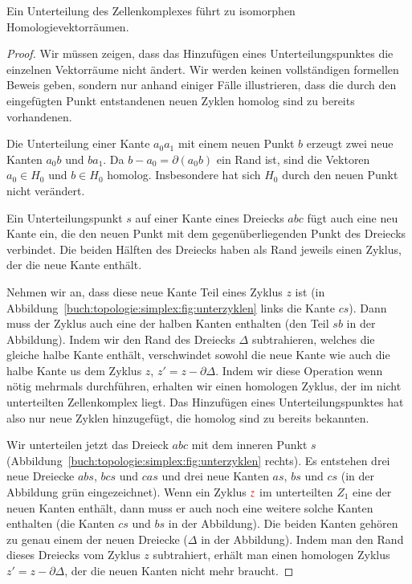 \begin{satz}
\label{buch:topologie:eulercharakteristik:satz:homologieunterteilung}
Ein Unterteilung des Zellenkomplexes führt zu isomorphen
Homologievektorräumen.
\end{satz}

\begin{proof}
%
Wir müssen zeigen, dass das Hinzufügen eines Unterteilungspunktes 
die einzelnen Vektorräume nicht ändert.
Wir werden keinen vollständigen formellen Beweis geben, sondern
nur anhand einiger Fälle illustrieren, dass die durch den eingefügten
Punkt entstandenen neuen Zyklen homolog sind zu bereits vorhandenen.

Die Unterteilung einer Kante $a_0a_1$ mit einem neuen Punkt $b$ erzeugt
zwei neue Kanten $a_0b$ und $ba_1$.
Da $b-a_0=\partial (a_0b)$ ein Rand ist, sind die Vektoren $a_0\in H_0$
und $b\in H_0$ homolog.
Insbesondere hat sich $H_0$ durch den neuen Punkt nicht verändert.

Ein Unterteilungspunkt $s$ auf einer Kante eines Dreiecks $abc$ fügt auch
eine neu Kante ein, die den neuen Punkt mit dem gegenüberliegenden
Punkt des Dreiecks verbindet.
Die beiden Hälften des Dreiecks haben als Rand jeweils einen Zyklus,
der die neue Kante enthält.

Nehmen wir an, dass diese neue Kante Teil eines Zyklus $z$ ist
(in Abbildung~\ref{buch:topologie:simplex:fig:unterzyklen} links
die Kante $cs$).
Dann muss der Zyklus auch eine der halben Kanten enthalten (den
Teil $sb$ in der Abbildung).
Indem wir den Rand des Dreiecks $\Delta$ subtrahieren, welches die gleiche
halbe Kante enthält, verschwindet sowohl die neue Kante wie auch die
halbe Kante us dem Zyklus $z$, $z'=z-\partial\Delta$.
Indem wir diese Operation wenn nötig mehrmals durchführen, erhalten
wir einen homologen Zyklus, der im nicht unterteilten Zellenkomplex
liegt.
Das Hinzufügen eines Unterteilungspunktes hat also nur neue Zyklen
hinzugefügt, die homolog sind zu bereits bekannten.

Wir unterteilen jetzt das Dreieck $abc$ mit dem inneren Punkt $s$
(Abbildung~\ref{buch:topologie:simplex:fig:unterzyklen} rechts).
Es entstehen drei neue Dreiecke $abs$, $bcs$ und $cas$ und drei neue
Kanten $as$, $bs$ und $cs$ (in der Abbildung {\color{darkgreen}grün}
eingezeichnet).
Wenn ein Zyklus ${\color{darkred}z}$ im unterteilten $Z_1$ eine der
neuen Kanten enthält, dann muss er auch noch eine weitere solche
Kanten enthalten (die Kanten $cs$ und $bs$ in der Abbildung).
Die beiden Kanten gehören zu genau einem der neuen Dreiecke ($\Delta$
in der Abbildung).
Indem man den Rand dieses Dreiecks vom Zyklus $z$ subtrahiert, erhält
man einen homologen Zyklus $z'=z-\partial\Delta$, der die neuen Kanten
nicht mehr braucht.


\end{proof}
